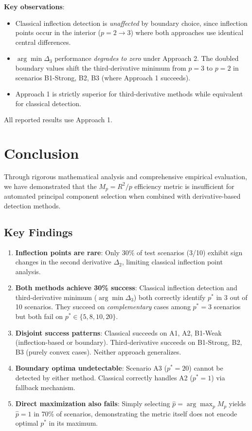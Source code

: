 \documentclass[11pt,a4paper]{article}
\begin{document}
\textbf{Key observations}:
\begin{itemize}
\item Classical inflection detection is \emph{unaffected} by boundary choice, since inflection points occur in the interior ($p = 2 \to 3$) where both approaches use identical central differences.
\item $\arg\min \Delta_3$ performance \emph{degrades to zero} under Approach 2. The doubled boundary values shift the third-derivative minimum from $p=3$ to $p=2$ in scenarios B1-Strong, B2, B3 (where Approach 1 succeeds).
\item Approach 1 is strictly superior for third-derivative methods while equivalent for classical detection.
\end{itemize}

All reported results use Approach 1.


\section{Conclusion}

Through rigorous mathematical analysis and comprehensive empirical evaluation, we have demonstrated that the $M_p = R^2/p$ efficiency metric is insufficient for automated principal component selection when combined with derivative-based detection methods.

\subsection{Key Findings}

\begin{enumerate}
\item \textbf{Inflection points are rare}: Only 30\% of test scenarios (3/10) exhibit sign changes in the second derivative $\Delta_2$, limiting classical inflection point analysis.

\item \textbf{Both methods achieve 30\% success}: Classical inflection detection and third-derivative minimum ($\arg\min \Delta_3$) both correctly identify $p^*$ in 3 out of 10 scenarios. They succeed on \emph{complementary} cases among $p^* = 3$ scenarios but both fail on $p^* \in \{5, 8, 10, 20\}$.

\item \textbf{Disjoint success patterns}: Classical succeeds on A1, A2, B1-Weak (inflection-based or boundary). Third-derivative succeeds on B1-Strong, B2, B3 (purely convex cases). Neither approach generalizes.

\item \textbf{Boundary optima undetectable}: Scenario A3 ($p^* = 20$) cannot be detected by either method. Classical correctly handles A2 ($p^* = 1$) via fallback mechanism.

\item \textbf{Direct maximization also fails}: Simply selecting $\hat{p} = \arg\max_p M_p$ yields $\hat{p} = 1$ in 70\% of scenarios, demonstrating the metric itself does not encode optimal $p^*$ in its maximum.
\end{enumerate}
\end{document}
